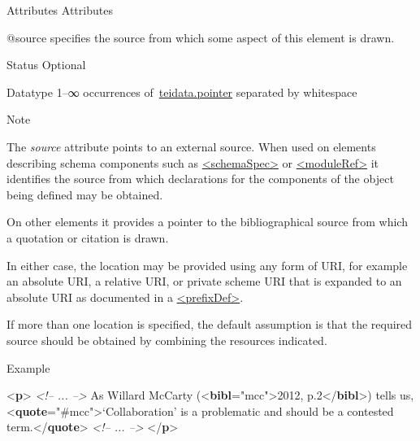 \begin{reflist}
    \item[{Attributes}]
  Attributes\hfil\\[-10pt]\begin{sansreflist}
    \item[@source]
  specifies the source from which some aspect of this element is drawn.
\begin{reflist}
    \item[{Status}]
  Optional
    \item[{Datatype}]
  1–∞ occurrences of \hyperref[TEI.teidata.pointer]{teidata.pointer} separated by whitespace
    \item[{Note}]
  \par
The {\itshape source} attribute points to an external source. When used on elements describing schema components such as \hyperref[TEI.schemaSpec]{<schemaSpec>} or \hyperref[TEI.moduleRef]{<moduleRef>} it identifies the source from which declarations for the components of the object being defined may be obtained.\par
On other elements it provides a pointer to the bibliographical source from which a quotation or citation is drawn. \par
In either case, the location may be provided using any form of URI, for example an absolute URI, a relative URI, or private scheme URI that is expanded to an absolute URI as documented in a \hyperref[TEI.prefixDef]{<prefixDef>}.\par
If more than one location is specified, the default assumption is that the required source should be obtained by combining the resources indicated. 
\end{reflist}  
\end{sansreflist}  
    \item[{Example}]
  \leavevmode\bgroup{}\exampleFont \begin{shaded}\noindent\mbox{}{<\textbf{p}>}\mbox{}\newline 
\textit{<!-- ... -->} As Willard McCarty ({<\textbf{bibl}\hspace*{1em}{xml:id}="{mcc}">}2012, p.2{</\textbf{bibl}>}) tells us, {<\textbf{quote}\hspace*{1em}{source}="{\#mcc}">}‘Collaboration’ is a problematic and should be a contested\mbox{}\newline 
\hspace*{1em}\hspace*{1em} term.{</\textbf{quote}>}\mbox{}\newline 
\textit{<!-- ... -->}\mbox{}\newline 
{</\textbf{p}>}\end{shaded}\egroup 



\end{reflist}
